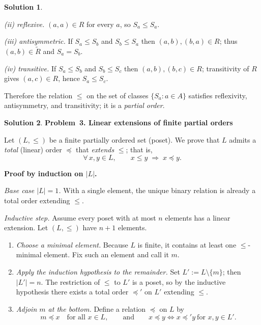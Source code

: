 \documentclass[12pt]{article}
\theoremstyle{definition} %
\newtheorem{solution}{Solution}
\theoremstyle{plain} %
\begin{document}
\begin{solution}
\begin{enumerate}[label=\textbf{(\alph*)}]
\smallskip\emph{(ii) reflexive.}
\((a,a)\in R\) for every \(a\), so \(S_a\le S_a\).

\smallskip\emph{(iii) antisymmetric.}
If \(S_a\le S_b\) and \(S_b\le S_a\) then \((a,b),(b,a)\in R\);
thus \((a,b)\in\widetilde R\) and \(S_a=S_b\).

\smallskip\emph{(iv) transitive.}
If \(S_a\le S_b\) and \(S_b\le S_c\) then
\((a,b),(b,c)\in R\); transitivity of \(R\) gives
\((a,c)\in R\), hence \(S_a\le S_c\).

\smallskip
Therefore the relation \(\le\) on the set of classes
\(\{S_a : a\in A\}\) satisfies reflexivity, antisymmetry, and
transitivity; it is a \emph{partial order}.
\end{enumerate}
\end{solution}

\begin{solution}
  \textbf{Problem 3.  Linear extensions of finite partial orders}
  
  Let \((L,\le)\) be a finite partially ordered set (poset).  
  We prove that \(L\) admits a \emph{total} (linear) order \(\preceq\) that
  \emph{extends} \(\le\); that is,
  \[
     \forall\,x,y\in L,\qquad x\le y\;\Longrightarrow\;x\preceq y.
  \]
  
  \medskip
  \textbf{Proof by induction on \(\lvert L\rvert\).}
  
  \smallskip
  \emph{Base case \(\lvert L\rvert=1\).}
  With a single element, the unique binary relation is already a total
  order extending \(\le\).
  
  \smallskip
  \emph{Inductive step.}
  Assume every poset with at most \(n\) elements has a linear extension.  
  Let \((L,\le)\) have \(n+1\) elements.
  
  \begin{enumerate}
      \item[\textbf{1.}] \emph{Choose a minimal element.}
            Because \(L\) is finite, it contains at least one
            \(\le\)-minimal element.  Fix such an element and call it
            \(m\).
  
      \item[\textbf{2.}] \emph{Apply the induction hypothesis to the
            remainder.}
            Set \(L' := L\setminus\{m\}\); then \(\lvert L'\rvert = n\).
            The restriction of \(\le\) to \(L'\) is a poset, so by the
            inductive hypothesis there exists a total order
            \(\preceq'\) on \(L'\) extending \(\le\).
  
      \item[\textbf{3.}] \emph{Adjoin \(m\) at the bottom.}
            Define a relation \(\preceq\) on \(L\) by
            \[
               m \preceq x\quad
               \text{for all }x\in L,
               \qquad\text{and}\qquad
               x\preceq y\iff x \preceq' y
               \ \text{for }x,y\in L'.
            \]
  

\end{enumerate}
\end{solution}
\end{document}
